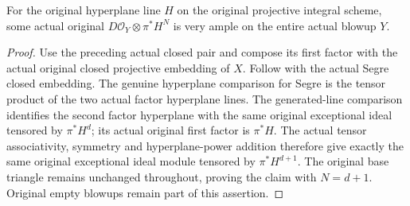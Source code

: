 \begin{lemma}
\label{lem:kn-nadel-nef-big-global-twisted-exceptional-very-ample}
\notready
{}
For the original hyperplane line $H$ on the original projective integral
scheme, some actual original $D\mathcal O_Y\otimes\pi^*H^N$ is very ample
on the entire actual blowup $Y$.
\end{lemma}
\begin{proof}
Use the preceding actual closed pair and compose its first factor with
the actual original closed projective embedding of $X$. Follow with the
actual Segre closed embedding. The genuine hyperplane comparison for
Segre is the tensor product of the two actual factor hyperplane lines.
The generated-line comparison identifies the second factor hyperplane
with the same original exceptional ideal tensored by $\pi^*H^d$; its
actual original first factor is $\pi^*H$. The actual tensor associativity,
symmetry and hyperplane-power addition therefore give exactly the same
original exceptional ideal module tensored by $\pi^*H^{d+1}$. The original
base triangle remains unchanged throughout, proving the claim with
$N=d+1$. Original empty blowups remain part of this assertion.
\end{proof}
